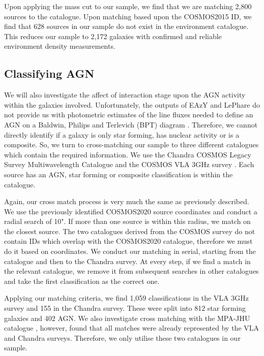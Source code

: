 \documentclass[fleqn,usenatbib]{mnras}
\begin{document}
Upon applying the mass cut to our sample, we find that we are matching 2,800 sources to the \citet{2017ApJ...837...16D} catalogue. Upon matching based upon the COSMOS2015 ID, we find that 628 sources in our sample do not exist in the environment catalogue. This reduces our sample to 2,172 galaxies with confirmed and reliable environment density measurements.

\subsection{Classifying AGN}\label{sec:agn-clsf}
\noindent We will also investigate the affect of interaction stage upon the AGN activity within the galaxies involved. Unfortunately, the outputs of EAzY and LePhare do not provide us with photometric estimates of the line fluxes needed to define an AGN on a Baldwin, Philips and Terlevich (BPT) diagram \citep{}. Therefore, we cannot directly identify if a galaxy is only star forming, has nuclear activity or is a composite. So, we turn to cross-matching our sample to three different catalogues which contain the required information. We use the Chandra COSMOS Legacy Survey Multiwavelength Catalogue \citep{2016ApJ...817...34M} and the COSMOS VLA 3GHz survey \citep{2017A&A...602A...6S, 2017A&A...602A...3D}. Each source has an AGN, star forming or composite classification is within the catalogue.


Again, our cross match process is very much the same as previously described. We use the previously identified COSMOS2020 source coordinates and conduct a radial search of 10". If more than one source is within this radius, we match on the closest source. The two catalogues derived from the COSMOS survey do not contain IDs which overlap with the COSMOS2020 catalogue, therefore we must do it based on coordinates. We conduct our matching in serial, starting from the \citet{2017A&A...602A...6S} catalogue and then to the Chandra survey. At every step, if we find a match in the relevant catalogue, we remove it from subsequent searches in other catalogues and take the first classification as the correct one.

Applying our matching criteria, we find 1,059 classifications in the VLA 3GHz survey and 155 in the Chandra survey. These were split into 812 star forming galaxies and 402 AGN. We also investigate cross matching with the MPA-JHU catalogue \citep{2003MNRAS.341...33K, 2004MNRAS.351.1151B, 2007ApJS..173..267S}, however, found that all matches were already represented by the VLA and Chandra surveys. Therefore, we only utilise these two catalogues in our sample.
\end{document}
